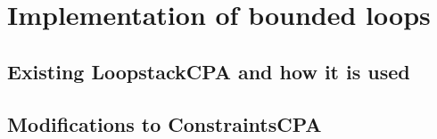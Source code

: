 \section{Implementation of bounded loops}
\subsection{Existing LoopstackCPA and how it is used}
\subsection{Modifications to ConstraintsCPA}

